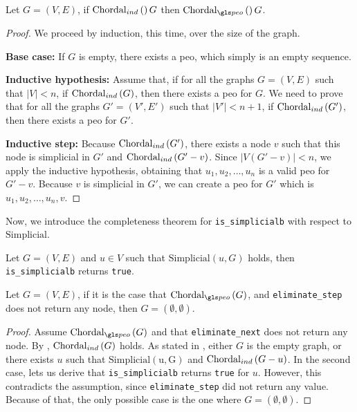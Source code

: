 \begin{lemma}\label{lem:chordal21}
    Let $G = (V, E)$, if $\mathrm{Chordal}_{ind}\left({}\right){G}$ then $\chordalpeo{}{G}$.
\end{lemma}
\begin{proof}
    We proceed by induction, this time, over the size of the graph.

    \textbf{Base case:}
    If $G$ is empty, there exists a \gls{peo}, which simply is an empty sequence.

    \medskip

    \textbf{Inductive hypothesis:}
    Assume that, if for all the graphs $G = (V, E)$ such that $|V| < n$, if $\mathrm{Chordal}_{ind}\left({G}\right)$, then there exists a \gls{peo} for $G$. We need to prove that for all the graphs $G' = (V', E')$ such that $|V'| < n+1$, if $\mathrm{Chordal}_{ind}\left({G'}\right)$, then there exists a \gls{peo} for $G'$.

    \medskip

    \textbf{Inductive step:}
    Because $\mathrm{Chordal}_{ind}\left({G'}\right)$, there exists a node $v$ such that this node is simplicial in $G'$ and $\mathrm{Chordal}_{ind}\left({G' - v}\right)$. Since $|V(G' - v)| < n$, we apply the inductive hypothesis, obtaining that $u_1, u_2, \dots, u_n$ is a valid \gls{peo} for $G' - v$. Because $v$ is simplicial in $G'$, we can create a \gls{peo} for $G'$ which is $u_1, u_2, \dots, u_n, v$.
\end{proof}

Now, we introduce the completeness theorem for \texttt{is\_simplicialb} with respect to $\mathrm{Simplicial}$.

\begin{lemma}\label{lem:sbcomp}
Let $G = (V, E)$ and $u \in V$ such that $\mathrm{Simplicial}(u, G)$ holds, then \texttt{is\_simplicialb} returns \texttt{true}. \Coqed
\end{lemma}

\begin{theorem}\label{thm:inv-elim-2}
    Let $G = (V, E)$, if it is the case that $\chordalpeo{G}$, and \texttt{eliminate\_step} does not return any node, then $G = (\emptyset, \emptyset)$. \Coqed
\end{theorem}
\begin{proof}
    Assume $\chordalpeo{G}$ and that \texttt{eliminate\_next} does not return any node. By , $\mathrm{Chordal}_{ind}\left({G}\right)$ holds. As stated in , either $G$ is the empty graph, or there exists $u$ such that $\mathrm{Simplicial(u, G)}$ and $\mathrm{Chordal}_{ind}\left({G - u}\right)$. In the second case,  lets us derive that \texttt{is\_simplicialb} returns \texttt{true} for $u$. However, this contradicts the assumption, since \texttt{eliminate\_step} did not return any value. Because of that, the only possible case is the one where $G = (\emptyset, \emptyset)$.
\end{proof}

